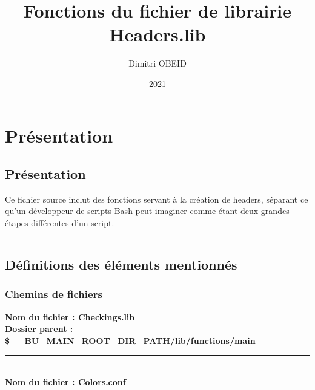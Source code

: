 \documentclass[a4paper,10pt]{article}
\title{\color{red}Fonctions du fichier de librairie \color{lime}Headers.lib}\color{white}
\author{Dimitri OBEID}
\date{2021}
\begin{document}
 \maketitle
 \tableofcontents
 \newpage

\color{red}
\section{Présentation}\color{white}

\color{green}
\subsection{Présentation}\color{white}

\begin{justify}
    Ce fichier source inclut des fonctions servant à la création de headers, séparant ce qu'un développeur de scripts Bash peut imaginer comme étant deux grandes étapes différentes d'un script.
\end{justify}




\color{green}\par\noindent\rule{\textwidth}{0.4pt}\color{white}

\color{green}
\subsection{Définitions des éléments mentionnés}\color{white}

\color{blue}
\subsubsection{Chemins de fichiers}\color{white}

\textbf{Nom du fichier : \color{lime}Checkings.lib}\\[1\baselineskip]

\textbf{Dossier parent : \color{orange}\$\_\_BU\_MAIN\_ROOT\_DIR\_PATH\color{lime}/lib/functions/main}\\[1\baselineskip]



\color{lime}\par\noindent\rule{\textwidth}{0.4pt}\color{white}\\[1\baselineskip]

\textbf{Nom du fichier : \color{lime}Colors.conf}\\[1\baselineskip]
\end{document}
